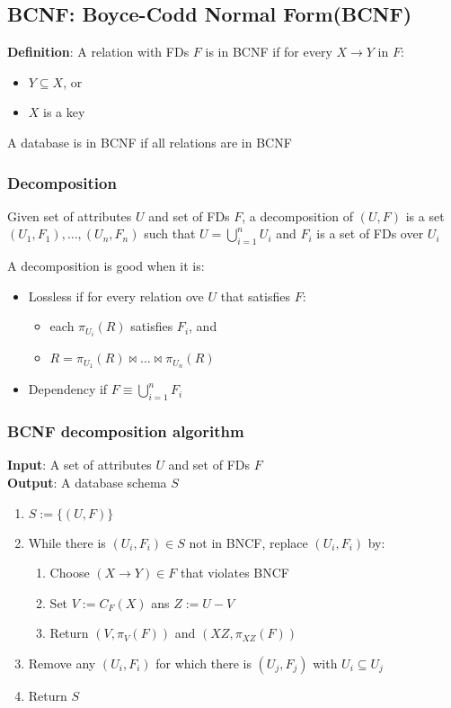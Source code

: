 \documentclass{article}
\begin{document}
\subsection{BCNF: Boyce-Codd Normal Form(BCNF)}

\textbf{Definition}: A relation with FDs $F$ is in BCNF if for every $X \rightarrow Y$ in $F$:
\begin{itemize}
  \item $Y \subseteq X$, or
  \item $X$ is a key
\end{itemize}

A database is in BCNF if all relations are in BCNF

\subsubsection*{Decomposition}
Given set of attributes $U$ and set of FDs $F$, a decomposition of $(U,F)$ is a set $(U_1,F_1),...,(U_n,F_n)$ such that $U = \bigcup_{i=1}^n U_i$ and $F_i$ is a set of FDs over $U_i$

A decomposition is good when it is:
\begin{itemize}
  \item Lossless \subitem if for every relation ove $U$ that satisfies $F$: \begin{itemize}
          \item each $\pi_{U_i}(R)$ satisfies $F_i$, and
          \item $R = \pi_{U_1}(R) \Join ... \Join \pi_{U_n}(R)$
        \end{itemize}
  \item Dependency \subitem if $F \equiv \bigcup_{i=1}^n F_i$
\end{itemize}

\subsubsection*{BCNF decomposition algorithm}
\textbf{Input}: A set of attributes $U$ and set of FDs $F$\\
\textbf{Output}: A database schema $S$

\begin{enumerate}
  \item $S := \{(U,F)\}$
  \item While there is $(U_i,F_i) \in S$ not in BNCF, replace $(U_i,F_i)$ by:
        \begin{enumerate}
          \item Choose $(X \rightarrow Y)\in F$ that violates BNCF
          \item Set $V:= C_F(X)$ ans $Z:= U-V$
          \item Return $(V,\pi_V(F))$ and $(XZ,\pi_{XZ}(F))$
        \end{enumerate}
  \item Remove any $(U_i, F_i)$ for which there is $(U_j,F_j)$ with $U_i \subseteq U_j$
  \item Return $S$
\end{enumerate}
\end{document}
